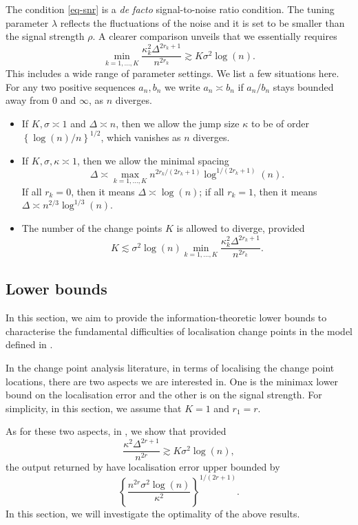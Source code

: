 \documentclass{article}
\begin{document}
	
The condition \eqref{eq-snr} is a \emph{de facto} signal-to-noise ratio condition.  The tuning parameter $\lambda$ reflects the fluctuations of the noise and it is set to be smaller than the signal strength $\rho$.  A clearer comparison unveils that we essentially requires
	\begin{equation}\label{eq-snr-detailed}
		\min_{k = 1, \ldots, K} \frac{\kappa_k^2 \Delta^{2r_k+1}}{n^{2r_k}} \gtrsim K \sigma^2 \log(n).
	\end{equation}
	This includes a wide range of parameter settings.  We list a few situations here.  For any two positive sequences $a_n, b_n$ we write $a_n \asymp b_n$ if $a_n/b_n$ stays bounded away from $0$ and $\infty$, as $n$ diverges. 
	\begin{itemize}
	\item If $K, \sigma \asymp 1$ and $\Delta \asymp n$, then we allow the jump size $\kappa$ to be of order $\left\{\log(n)/n\right\}^{1/2}$, which vanishes as $n$ diverges.
	\item If $K, \sigma, \kappa \asymp 1$, then we allow the minimal spacing 
		\[
			\Delta \asymp \max_{k = 1, \ldots, K} n^{2r_k/(2r_k+1)}\log^{1/(2r_k+1)}(n).
		\]
		If all $r_k = 0$, then it means $\Delta \asymp \log(n)$; if all $r_k = 1$, then it means $\Delta \asymp n^{2/3}\log^{1/3}(n)$.
	\item The number of the change points $K$ is allowed to diverge, provided 
		\[
			K \lesssim \sigma^2 \log(n) \min_{k = 1, \ldots, K} \frac{\kappa_k^2 \Delta^{2r_k+1}}{n^{2r_k}}.
		\]		
	\end{itemize}

\subsection{Lower bounds}\label{sec-lb-state}

In this section, we aim to provide the information-theoretic lower bounds to characterise the fundamental difficulties of localisation change points in the model defined in . 

In the change point analysis literature, in terms of localising the change point locations, there are two aspects we are interested in.  One is the minimax lower bound on the localisation error and the other is on the signal strength.  For simplicity, in this section, we assume that $K = 1$ and $r_1 = r$.

As for these two aspects, in , we show that provided
	\begin{equation}\label{eq-snr-upper-bound}
		\frac{\kappa^2 \Delta^{2r+1}}{n^{2r}} \gtrsim K \sigma^2 \log(n),
	\end{equation}
	the output returned by  have localisation error upper bounded by
	\[
		\left\{\frac{n^{2r} \sigma^2 \log(n)}{\kappa^2}\right\}^{1/(2r+1)}.
	\]
	In this section, we will investigate the optimality of the above results.  
	
\end{document}
